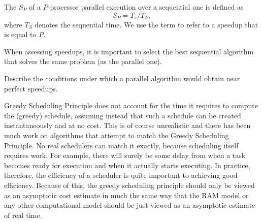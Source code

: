 \begin{definition}[Speedup]
The  $S_P$ of a $P$-processor parallel execution over a
sequential one is defined as
\[
S_P = T_s / T_P, 
\]
where $T_S$ denotes the sequential time.
%
We use the term  to refer to a speedup that is
equal to $P$.

When assessing speedups, it is important to select the best sequential
algorithm that solves the same problem (as the parallel one).  
\end{definition}

\begin{exercise}
Describe the conditions under which a parallel algorithm would obtain
near perfect speedups.
\end{exercise}






\begin{remark}
Greedy Scheduling Principle does not account for the time it requires
to compute the (greedy) schedule, assuming instead that such a
schedule can be created instantaneously and at no cost.
%
This is of course unrealistic and there has been much work on
algorithms that attempt to match the Greedy Scheduling Principle.
%
No real schedulers can match it exactly, because scheduling itself
requires work.
%
For example, there will surely be some delay from when a task becomes
ready for execution and when it actually starts executing.
%
In practice, therefore, the efficiency of a scheduler is quite
important to achieving good efficiency.  
%
Because of this, the greedy scheduling principle should only be viewed
as an asymptotic cost estimate in much the same way that the RAM model
or any other computational model should be just viewed as an
asymptotic estimate of real time.
%
\end{remark}


